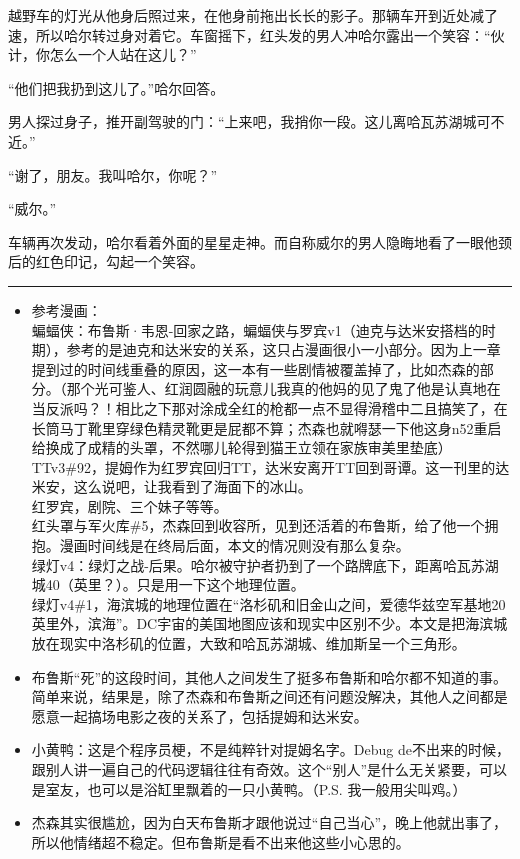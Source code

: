 \documentclass[../main]{subfiles}
\begin{document}
越野车的灯光从他身后照过来，在他身前拖出长长的影子。那辆车开到近处减了速，所以哈尔转过身对着它。车窗摇下，红头发的男人冲哈尔露出一个笑容：“伙计，你怎么一个人站在这儿？”

“他们把我扔到这儿了。”哈尔回答。

男人探过身子，推开副驾驶的门：“上来吧，我捎你一段。这儿离哈瓦苏湖城可不近。”

“谢了，朋友。我叫哈尔，你呢？”

“威尔。”

车辆再次发动，哈尔看着外面的星星走神。而自称威尔的男人隐晦地看了一眼他颈后的红色印记，勾起一个笑容。

\begin{center}\rule{0.5\linewidth}{0.5pt}\end{center}

\begin{itemize}
    \item
          参考漫画：\\
          蝙蝠侠：布鲁斯·韦恩-回家之路，蝙蝠侠与罗宾v1（迪克与达米安搭档的时期），参考的是迪克和达米安的关系，这只占漫画很小一小部分。因为上一章提到过的时间线重叠的原因，这一本有一些剧情被覆盖掉了，比如杰森的部分。（那个光可鉴人、红润圆融的玩意儿我真的他妈的见了鬼了他是认真地在当反派吗？！相比之下那对涂成全红的枪都一点不显得滑稽中二且搞笑了，在长筒马丁靴里穿绿色精灵靴更是屁都不算；杰森也就嘚瑟一下他这身n52重启给换成了成精的头罩，不然哪儿轮得到猫王立领在家族审美里垫底）\\
          TTv3\#92，提姆作为红罗宾回归TT，达米安离开TT回到哥谭。这一刊里的达米安，这么说吧，让我看到了海面下的冰山。\\
          红罗宾，剧院、三个妹子等等。\\
          红头罩与军火库\#5，杰森回到收容所，见到还活着的布鲁斯，给了他一个拥抱。漫画时间线是在终局后面，本文的情况则没有那么复杂。\\
          绿灯v4：绿灯之战-后果。哈尔被守护者扔到了一个路牌底下，距离哈瓦苏湖城40（英里？）。只是用一下这个地理位置。\\
          绿灯v4\#1，海滨城的地理位置在“洛杉矶和旧金山之间，爱德华兹空军基地20英里外，滨海”。DC宇宙的美国地图应该和现实中区别不少。本文是把海滨城放在现实中洛杉矶的位置，大致和哈瓦苏湖城、维加斯呈一个三角形。
    \item
          布鲁斯“死”的这段时间，其他人之间发生了挺多布鲁斯和哈尔都不知道的事。简单来说，结果是，除了杰森和布鲁斯之间还有问题没解决，其他人之间都是愿意一起搞场电影之夜的关系了，包括提姆和达米安。
    \item
          小黄鸭：这是个程序员梗，不是纯粹针对提姆名字。Debug
          de不出来的时候，跟别人讲一遍自己的代码逻辑往往有奇效。这个“别人”是什么无关紧要，可以是室友，也可以是浴缸里飘着的一只小黄鸭。（P.S.
          我一般用尖叫鸡。）
    \item
          杰森其实很尴尬，因为白天布鲁斯才跟他说过“自己当心”，晚上他就出事了，所以他情绪超不稳定。但布鲁斯是看不出来他这些小心思的。
\end{itemize}
\end{document}

